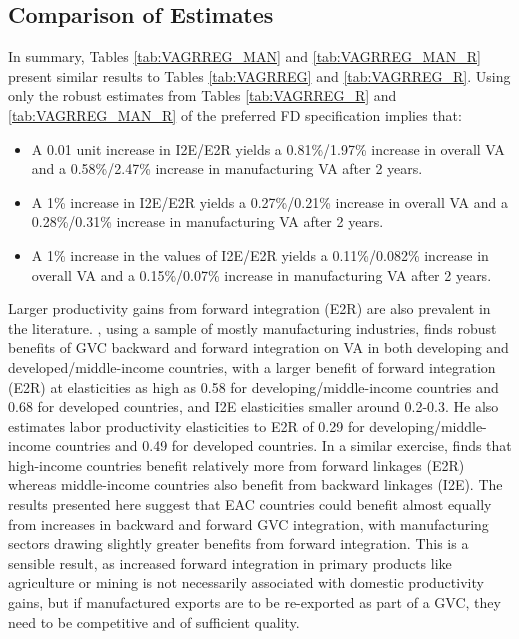 \documentclass[a4paper]{article}
\begin{document}
\subsection{Comparison of Estimates}

In summary, Tables \ref{tab:VAGRREG_MAN} and \ref{tab:VAGRREG_MAN_R} present similar results to Tables \ref{tab:VAGRREG} and \ref{tab:VAGRREG_R}. Using only the robust estimates from Tables \ref{tab:VAGRREG_R} and \ref{tab:VAGRREG_MAN_R} of the preferred FD specification implies that:
\begin{itemize}
\item A 0.01 unit increase in I2E/E2R yields a 0.81\%/1.97\% increase in overall VA and a 0.58\%/2.47\% increase in manufacturing VA after 2 years.
\item A 1\% increase in I2E/E2R yields a 0.27\%/0.21\% increase in overall VA and a 0.28\%/0.31\% increase in manufacturing VA after 2 years.
\item A 1\% increase in the values of I2E/E2R yields a 0.11\%/0.082\% increase in overall VA and a 0.15\%/0.07\% increase in manufacturing VA after 2 years.
\end{itemize}

Larger productivity gains from forward integration (E2R) are also prevalent in the literature. \citet{Kummritz20161}, using a sample of mostly manufacturing industries, finds robust benefits of GVC backward and forward integration on VA in both developing and developed/middle-income countries, with a larger benefit of forward integration (E2R) at elasticities as high as 0.58 for developing/middle-income countries and 0.68 for developed countries, and I2E elasticities smaller around 0.2-0.3. He also estimates labor productivity elasticities to E2R of 0.29 for developing/middle-income countries and 0.49 for developed countries. In a similar exercise, \citet{kummritz2015global} finds that high-income countries benefit relatively more from forward linkages (E2R) whereas middle-income countries also benefit from backward linkages (I2E). The results presented here suggest that EAC countries could benefit almost equally from increases in backward and forward GVC integration, with manufacturing sectors drawing slightly greater benefits from forward integration. 
This is a sensible result, as increased forward integration in primary products like agriculture or mining is not necessarily associated with domestic productivity gains, but if manufactured exports are to be re-exported as part of a GVC, they need to be competitive and of sufficient quality.  \newline
\end{document}
